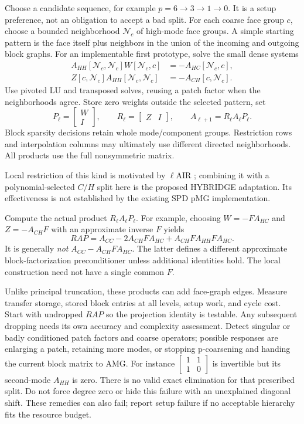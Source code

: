 \documentclass[11pt]{article}
\numberwithin{equation}{section}
\numberwithin{figure}{section}
\numberwithin{table}{section}
\begin{document}
Choose a candidate sequence, for example $p=6\to3\to1\to0$.
It is a setup preference, not an obligation to accept a bad split.
For each coarse face group $c$, choose a bounded neighborhood $\mathcal N_c$
of high-mode face groups. A simple starting pattern is the face itself plus
neighbors in the union of the incoming and outgoing block graphs.
For an implementable first prototype, solve the small dense systems
\begin{align}
 A_{HH}[\mathcal N_c,\mathcal N_c] W[\mathcal N_c,c]
   &=-A_{HC}[\mathcal N_c,c],\label{eq:localp}\\
 Z[c,\mathcal N_c] A_{HH}[\mathcal N_c,\mathcal N_c]
   &=-A_{CH}[c,\mathcal N_c].\label{eq:localr}
\end{align}
Use pivoted LU and transposed solves, reusing a patch factor when the
neighborhoods agree. Store zero weights outside the selected pattern, set
\[
 P_\ell=\begin{bmatrix}W\\I\end{bmatrix},\qquad
 R_\ell=\begin{bmatrix}Z&I\end{bmatrix},\qquad
 A_{\ell+1}=R_\ell A_\ell P_\ell.
\]
Block sparsity decisions retain whole mode/component groups. Restriction
rows and interpolation columns may ultimately use different directed
neighborhoods. All products use the full nonsymmetric matrix.

Local restriction of this kind is motivated by $\ell$AIR
\cite{lair}; combining it with a polynomial-selected $C/H$ split here is
the proposed HYBRIDGE adaptation. Its effectiveness is not established by
the existing SPD pMG implementation.

Compute the actual product $R_\ell A_\ell P_\ell$. For example, choosing
$W=-FA_{HC}$ and $Z=-A_{CH}F$ with an approximate inverse $F$ yields
\[
 RAP=A_{CC}-2A_{CH}FA_{HC}+A_{CH}FA_{HH}FA_{HC}.
\]
It is generally \emph{not} $A_{CC}-A_{CH}FA_{HC}$. The latter defines a
different approximate block-factorization preconditioner unless additional
identities hold. The local construction need not have a single common $F$.

Unlike principal truncation, these products can add face-graph edges.
Measure transfer storage, stored block entries at all levels, setup work,
and cycle cost. Start with undropped $RAP$ so the projection identity is
testable. Any subsequent dropping needs its own accuracy and complexity
assessment. Detect singular or badly conditioned patch factors and coarse
operators; possible responses are enlarging a patch, retaining more modes,
or stopping p-coarsening and handing the current block matrix to AMG.
For instance $\left[\begin{smallmatrix}1&1\\1&0\end{smallmatrix}\right]$
is invertible but its second-mode $A_{HH}$ is zero. There is no valid exact
elimination for that prescribed split. Do not force degree zero or hide this
failure with an unexplained diagonal shift. These remedies can also fail;
report setup failure if no acceptable hierarchy fits the resource budget.
\end{document}
